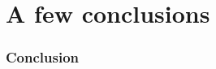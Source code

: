 \documentclass[handout,9pt]{beamer}
\begin{document}
\section{A few conclusions}
\begin{frame}
 \frametitle	{Conclusion}
 
 
 
 \end{frame}
 
\end{document}

